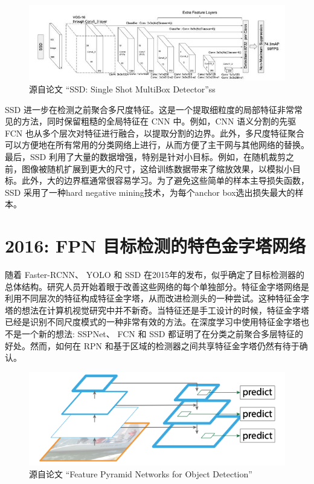 \documentclass{article}
\begin{document}
	   	\begin{figure}[htpb]
	   		\centering
	   		\includegraphics[width=\linewidth]{detectfig/8.jpg}
	   		\caption{源自论文 “SSD: Single Shot MultiBox Detector”ss}
	   	\end{figure}
   	
	   	SSD 进一步在检测之前聚合多尺度特征。这是一个提取细粒度的局部特征非常常见的方法，同时保留粗糙的全局特征在 CNN 中。例如，CNN 语义分割的先驱 FCN 也从多个层次对特征进行融合，以提取分割的边界。此外，多尺度特征聚合可以方便地在所有常用的分类网络上进行，从而方便了主干网与其他网络的替换。
	   	最后，SSD 利用了大量的数据增强，特别是针对小目标。例如，在随机裁剪之前，图像被随机扩展到更大的尺寸，这给训练数据带来了缩放效果，以模拟小目标。此外，大的边界框通常很容易学习。为了避免这些简单的样本主导损失函数，SSD 采用了一种hard negative mining技术，为每个anchor box选出损失最大的样本。
	   	
	   	
	   	
	   	\section{2016: FPN 目标检测的特色金字塔网络} 
	   	随着 Faster-RCNN、 YOLO 和 SSD 在2015年的发布，似乎确定了目标检测器的总体结构。研究人员开始着眼于改善这些网络的每个单独部分。特征金字塔网络是利用不同层次的特征构成特征金字塔，从而改进检测头的一种尝试。这种特征金字塔的想法在计算机视觉研究中并不新奇。当特征还是手工设计的时候，特征金字塔已经是识别不同尺度模式的一种非常有效的方法。在深度学习中使用特征金字塔也不是一个新的想法: SSPNet、 FCN 和 SSD 都证明了在分类之前聚合多层特征的好处。然而，如何在 RPN 和基于区域的检测器之间共享特征金字塔仍然有待于确认。
	   	
	   	\begin{figure}[htpb]
	   		\centering
	   		\includegraphics[width=\linewidth]{detectfig/9.png}
	   		\caption{源自论文 “Feature Pyramid Networks for Object Detection”}
	   	\end{figure}
   	
\end{document}
